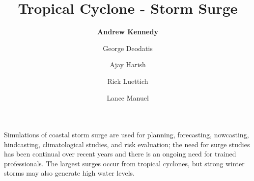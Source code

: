%
%
%


%
%
%
%
%
%
%
%

\title{Tropical Cyclone - Storm Surge}
\author{
    \textbf{Andrew Kennedy} 
    \and {George Deodatis}
    \and {Ajay Harish}
    \and {Rick Luettich}
    \and {Lance Manuel}}
\tocauthor{}
%
%
\maketitle

Simulations of coastal storm surge are used for planning, forecasting, nowcasting, hindcasting, climatological studies, and risk evaluation; the need for surge studies has been continual over recent years and there is an ongoing need for trained professionals. The largest surges occur from tropical cyclones, but strong winter storms may also generate high water levels.


